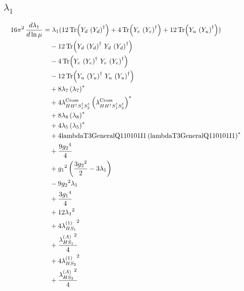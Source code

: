 \documentclass[10pt,a4paper]{article}
\begin{document}
\subsection*{$\lambda_1$}
\begin{align*}
16\pi^2\,\frac{d \lambda_1}{d\ln\mu} &={\lambda_1} (12 \operatorname{Tr}\!\left({Y_d}\,\left({Y_d}\right)^{\dagger}\right)+4 \operatorname{Tr}\!\left({Y_e}\,\left({Y_e}\right)^{\dagger}\right)+12 \operatorname{Tr}\!\left({Y_u}\,\left({Y_u}\right)^{\dagger}\right)) \\
&\quad -12 \operatorname{Tr}\!\left({Y_d}\,\left({Y_d}\right)^{\dagger}\,{Y_d}\,\left({Y_d}\right)^{\dagger}\right) \\
&\quad -4 \operatorname{Tr}\!\left({Y_e}\,\left({Y_e}\right)^{\dagger}\,{Y_e}\,\left({Y_e}\right)^{\dagger}\right) \\
&\quad -12 \operatorname{Tr}\!\left({Y_u}\,\left({Y_u}\right)^{\dagger}\,{Y_u}\,\left({Y_u}\right)^{\dagger}\right) \\
&\quad +8 {\lambda_{7}} \left({\lambda_{7}}\right)^{*} \\
&\quad +4 {\lambda_{H H^\dagger S_1^\dagger S_2^\dagger}^{\rm Cross}} \left({\lambda_{H H^\dagger S_1^\dagger S_2^\dagger}^{\rm Cross}}\right)^{*} \\
&\quad +8 {\lambda_{8}} \left({\lambda_{8}}\right)^{*} \\
&\quad +4 {\lambda_5} \left({\lambda_5}\right)^{*} \\
&\quad +4 \text{lambdaT3GeneralQ110101I1} \left(\text{lambdaT3GeneralQ110101I1}\right)^{*} \\
&\quad +\frac{9 {g_2}^4}{4} \\
&\quad +{g_1}^2 \left(\frac{3 {g_2}^2}{2}-3 {\lambda_1}\right) \\
&\quad -9 {g_2}^2 {\lambda_1} \\
&\quad +\frac{3 {g_1}^4}{4} \\
&\quad +12 {\lambda_1}^2 \\
&\quad +4 {\lambda_{HS_1}^{(1)}}^2 \\
&\quad +\frac{{\lambda_{HS_1}^{(A)}}^2}{4} \\
&\quad +4 {\lambda_{HS_2}^{(1)}}^2 \\
&\quad +\frac{{\lambda_{HS_2}^{(A)}}^2}{4} \\
\end{align*}
\end{document}
